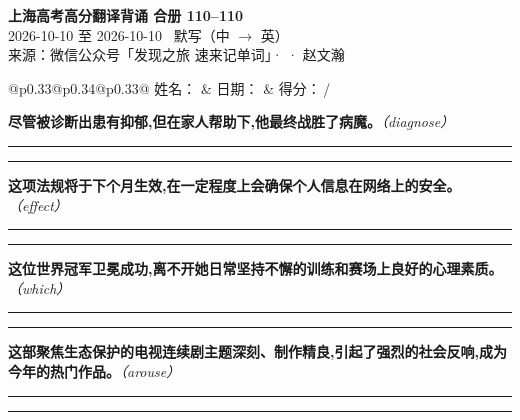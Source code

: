 \documentclass[11pt,a4paper]{article}
\newcommand{\num}[1]{\makebox[1.9em][r]{#1.}\hspace{0.3em}}
\newcommand{\wline}{\noindent\rule{\linewidth}{0.4pt}}
\newcommand{\prompt}[1]{\emph{\textcolor{tipblue}{\small（#1）}}}
\begin{document}
\pagestyle{plain}
\begin{center}
{\LARGE\bfseries 上海高考高分翻译背诵 \quad 合册 110–110}\\[0.25em]
{\large 2026-10-10 至 2026-10-10 \quad\ 默写（中 $\to$ 英）}\\[0.35em]
{\footnotesize 来源：微信公众号「发现之旅 速来记单词」·  · 赵文瀚}
\end{center}

\vspace{0.4em}
\noindent\begin{tabular}{@{}p{0.33\textwidth}@{}p{0.34\textwidth}@{}p{0.33\textwidth}@{}}
姓名：\underline{\hspace{2.0cm}} & 日期：\underline{\hspace{2.0cm}} & 得分：\underline{\hspace{1.4cm}}\,/ \\
\end{tabular}

\vspace{0.5em}

\vspace{0.8em}
\vspace{0.35em}\vspace{0.15em}

\begin{minipage}{\linewidth}

\num{1}\textbf{尽管被诊断出患有抑郁,但在家人帮助下,他最终战胜了病魔。}\prompt{diagnose}

\vspace{0.3em}

\wline\vspace{0.3em}
\wline

\end{minipage}

\begin{minipage}{\linewidth}

\num{2}\textbf{这项法规将于下个月生效,在一定程度上会确保个人信息在网络上的安全。}\prompt{effect}

\vspace{0.3em}

\wline\vspace{0.3em}
\wline

\end{minipage}

\begin{minipage}{\linewidth}

\num{3}\textbf{这位世界冠军卫冕成功,离不开她日常坚持不懈的训练和赛场上良好的心理素质。}\prompt{which}

\vspace{0.3em}

\wline\vspace{0.3em}
\wline

\end{minipage}

\begin{minipage}{\linewidth}

\num{4}\textbf{这部聚焦生态保护的电视连续剧主题深刻、制作精良,引起了强烈的社会反响,成为今年的热门作品。}\prompt{arouse}

\vspace{0.3em}

\wline\vspace{0.3em}
\wline

\end{minipage}
\end{document}
